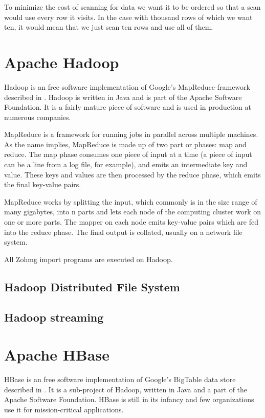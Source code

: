 \documentclass[a4paper,10pt]{book}
\begin{document}
To minimize the cost of scanning for data we want it to be ordered so that
a scan would use every row it visits. In the case with thousand rows of
which we want ten, it would mean that we just scan ten rows and use all of
them.


\section{Apache Hadoop}

Hadoop is an free software implementation of Google's MapReduce-framework described in \cite{mapreduce}. Hadoop is written in Java and is part of the Apache Software Foundation.  It is a fairly mature piece of software and is used in production at numerous companies.

MapReduce is a framework for running jobs in parallel across multiple machines.  As the name implies, MapReduce is made up of two part or phases: map and reduce. The map phase consumes one piece of input at a time (a piece of input can be a line from a log file, for example), and emits an intermediate key and value. These keys and values are then processed by the reduce phase, which emits the final key-value pairs.

MapReduce works by splitting the input, which commonly is in the size range of many gigabytes, into n parts and lets each node of the computing cluster work on one or more parts. The mapper on each node emits key-value pairs which are fed into the reduce phase. The final output is collated, usually on a network file system.

All Zohmg import programs are executed on Hadoop.


\subsection{Hadoop Distributed File System}

\subsection{Hadoop streaming}

\section{Apache HBase}

HBase is an free software implementation of Google's BigTable data store described in \cite{bigtable}. It is a sub-project of Hadoop, written in Java and a part of the Apache Software Foundation. HBase is still in its infancy and few organizations use it for mission-critical applications.
\end{document}
